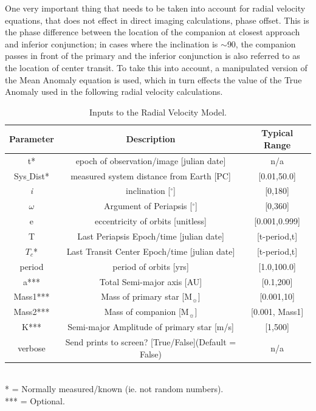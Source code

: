 \documentclass[12pt,preprint]{aastex}
\begin{document}
One very important thing that needs to be taken into account for radial velocity equations, that does not effect in direct imaging calculations, phase offset.  This is the phase difference between the location of the companion at closest approach and inferior conjunction; in cases where the inclination is $\sim$90, the companion passes in front of the primary and the inferior conjunction is also referred to as the location of center transit.  To take this into account, a manipulated version of the Mean Anomaly equation is used, which in turn effects the value of the True Anomaly used in the following radial velocity calculations.
\begin{table}[h]
\centering
\caption{ Inputs to the Radial Velocity Model.}
\begin{tabular}{c c c}
\hline\hline
Parameter & Description & Typical Range \\
\hline
t* & epoch of observation/image [julian date] & n/a\\
Sys$\_$Dist* & measured system distance from Earth [PC] &  [0.01,50.0]\\
{\it i} & inclination [$^{\circ}$] & [0,180]\\
$\omega$ & Argument of Periapsis [$^{\circ}$] & [0,360]\\
e & eccentricity of orbits [unitless] & [0.001,0.999]\\
T & Last Periapsis Epoch/time [julian date] & [t-period,t]\\
$T_c$* & Last Transit Center Epoch/time [julian date] & [t-period,t]\\
period & period of orbits [yrs] & [1.0,100.0]\\
a*** & Total Semi-major axis [AU]  & [0.1,200] \\
Mass1*** & Mass of primary star [M$_{\sun}$] & [0.001,10] \\
Mass2*** & Mass of companion [M$_{\sun}$] & [0.001, Mass1] \\
K*** & Semi-major Amplitude of primary star [m/s]& [1,500]\\
verbose & Send prints to screen? [True/False](Default = False) & n/a\\
\hline
\end{tabular}
\\
  * = Normally measured/known (ie. not random numbers).\\
 *** = Optional.
\end{table}
\end{document}
